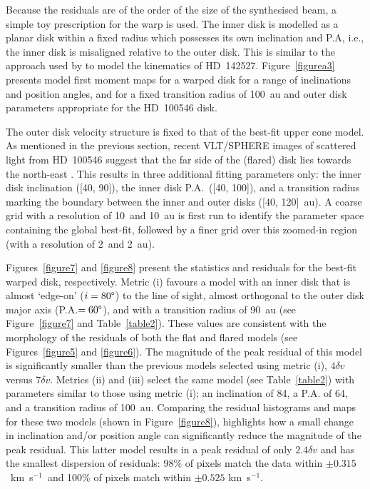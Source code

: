 \documentclass[onecolumn]{aastex6}
\newcommand{\kms}{km~s$^{-1}$}
\begin{document}
Because the residuals are of the order of the size of the synthesised beam,
a simple toy prescription for the warp is used.
The inner disk is modelled as a planar disk within a fixed radius which
possesses its own inclination and P.A, i.e., the inner disk is
misaligned relative to the outer disk.
This is similar to the approach used by \citet{rosenfeld14} to
model the kinematics of HD~142527.
Figure~\ref{figurea3} presents model first moment maps for a warped
disk for a range of inclinations and position angles, and for a fixed
transition radius of 100~au and outer disk parameters
appropriate for the HD~100546 disk.

The outer disk velocity structure is fixed to that of the best-fit upper cone model.
As mentioned in the previous section, recent VLT/SPHERE images of scattered light
from HD~100546 suggest that the far side of the (flared) disk lies towards the
north-east \citep{garufi16}.
This results in three additional fitting parameters only:
the inner disk inclination ([40\degree, 90\degree]), the inner disk P.A.~([40\degree, 100\degree]), and
a transition radius marking the boundary between the inner
and outer disks ([40, 120]~au).
A coarse grid with a resolution of 10\degree~and 10~au is first run to
identify the parameter space containing the global best-fit, followed by
a finer grid over this zoomed-in region (with a resolution of 2\degree~and 2~au).

Figures~\ref{figure7} and \ref{figure8} present the statistics and residuals for
the best-fit warped disk, respectively.
Metric (i) favours a model with an inner disk that is almost `edge-on'
($i=80\degree$) to the line of sight, almost orthogonal to the outer disk
major axis (P.A.$= 60\degree$), and with a transition radius of 90~au
(see Figure~\ref{figure7} and Table~\ref{table2}).
These values are consistent with the morphology of the residuals of both
the flat and flared models (see Figures~\ref{figure5} and \ref{figure6}).
The magnitude of the peak residual of this model is significantly smaller than
the previous models selected using metric (i), $4 \delta v$ versus $7 \delta v$.
Metrics (ii) and (iii) select the same model (see Table~\ref{table2})
with parameters similar to those using metric (i); an inclination of
84\degree, a P.A. of 64\degree, and a transition radius of 100~au.
Comparing the residual histograms and maps for these two models (shown in
Figure~\ref{figure8}), highlights how a small change in inclination and/or
position angle can significantly reduce the magnitude of the peak residual.
This latter model results in a peak residual of only $2.4 \delta v$ and has
the smallest dispersion of residuals: 98\% of pixels match the data within
$\pm 0.315$~\kms~and 100\% of pixels match within $\pm 0.525$ \kms.
\end{document}
